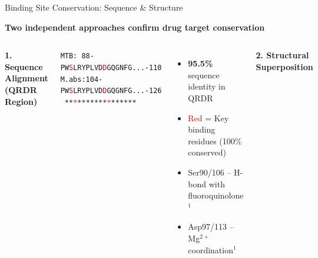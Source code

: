 \documentclass[aspectratio=169,xcolor=table]{beamer}
\begin{document}
\begin{frame}{Binding Site Conservation: Sequence \& Structure}

\textbf{Two independent approaches confirm drug target conservation}

\vspace{0.2cm}

\begin{columns}
\textbf{1. Sequence Alignment (QRDR Region)}

\vspace{0.1cm}

\footnotesize
\texttt{MTB:  88-PW\textcolor{red}{S}LRYPLVD\textcolor{red}{D}GQGNFG...-110}\\
\texttt{M.abs:104-PW\textcolor{red}{S}LRYPLVD\textcolor{red}{D}GQGNFG...-126}\\
\texttt{      \hspace{0.35cm}**\textcolor{red}{*}*******\textcolor{red}{*}******}
\normalsize

\vspace{0.2cm}

\begin{itemize}\setlength{\itemsep}{0pt}
    \item \textbf{95.5\%} sequence identity in QRDR
    \item \textcolor{red}{Red} = Key binding residues (100\% conserved)
    \item Ser90/106 -- H-bond with fluoroquinolone$^1$
    \item Asp97/113 -- Mg$^{2+}$ coordination$^1$
\end{itemize}

\textbf{2. Structural Superposition}

\vspace{0.1cm}

\begin{center}
\end{center}
\end{columns}
\end{frame}
\end{document}
